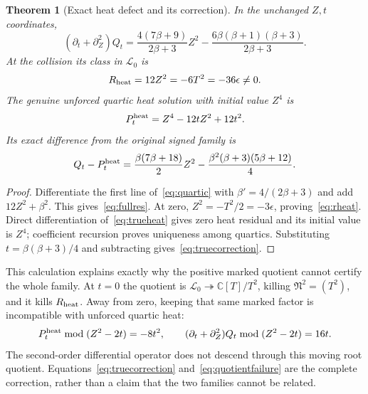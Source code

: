 \documentclass[11pt,a4paper]{article}
\newtheorem{theorem}{Theorem}[section]\newtheorem{proposition}[theorem]{Proposition}\newtheorem{lemma}[theorem]{Lemma}\newtheorem{corollary}[theorem]{Corollary}
\theoremstyle{definition}\newtheorem{definition}[theorem]{Definition}\newtheorem{remark}[theorem]{Remark}
\newcommand{\C}{\mathbb C}\newcommand{\R}{\mathbb R}\newcommand{\Z}{\mathbb Z}\newcommand{\B}{\mathbb B}
\begin{document}
\begin{theorem}[Exact heat defect and its correction]
In the unchanged $Z,t$ coordinates,
\begin{equation}
 (\partial_t+\partial_Z^2)Q_t
 =\frac{4(7\beta+9)}{2\beta+3}Z^2
 -\frac{6\beta(\beta+1)(\beta+3)}{2\beta+3}.              \label{eq:fullres}
\end{equation}
At the collision its class in $\mathscr L_0$ is
\begin{equation}
 R_{\rm heat}=12Z^2=-6T^2=-36\epsilon\ne0.               \label{eq:rheat}
\end{equation}
The genuine unforced quartic heat solution with initial value $Z^4$ is
\begin{equation}
 P_t^{\rm heat}=Z^4-12tZ^2+12t^2.                        \label{eq:trueheat}
\end{equation}
Its exact difference from the original signed family is
\begin{equation}
 Q_t-P_t^{\rm heat}
 =\frac{\beta(7\beta+18)}2Z^2
 -\frac{\beta^2(\beta+3)(5\beta+12)}4.                   \label{eq:truecorrection}
\end{equation}
\end{theorem}
\begin{proof}
Differentiate the first line of~\eqref{eq:quartic} with $\beta'=4/(2\beta+3)$ and add $12Z^2+\beta^2$. This gives~\eqref{eq:fullres}. At zero, $Z^2=-T^2/2=-3\epsilon$, proving~\eqref{eq:rheat}. Direct differentiation of~\eqref{eq:trueheat} gives zero heat residual and its initial value is $Z^4$; coefficient recursion proves uniqueness among quartics. Substituting $t=\beta(\beta+3)/4$ and subtracting gives~\eqref{eq:truecorrection}.
\end{proof}
This calculation explains exactly why the positive marked quotient cannot certify the whole family. At $t=0$ the quotient is $\mathscr L_0\twoheadrightarrow\C[T]/T^2$, killing $\mathfrak N^2=(T^2)$, and it kills $R_{\rm heat}$. Away from zero, keeping that same marked factor is incompatible with unforced quartic heat:
\begin{equation}
 P_t^{\rm heat}\bmod(Z^2-2t)=-8t^2,\qquad
 (\partial_t+\partial_Z^2)Q_t\bmod(Z^2-2t)=16t.           \label{eq:quotientfailure}
\end{equation}
The second-order differential operator does not descend through this moving root quotient. Equations~\eqref{eq:truecorrection} and~\eqref{eq:quotientfailure} are the complete correction, rather than a claim that the two families cannot be related.
\end{document}
